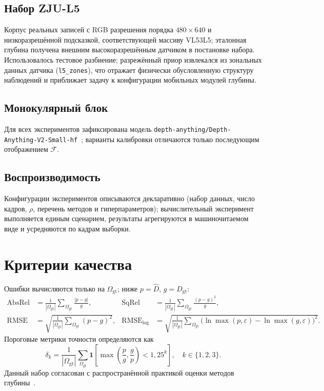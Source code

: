 \documentclass[12pt]{article}
\begin{document}
\subsection{Набор ZJU-L5}

Корпус реальных записей с RGB разрешения порядка $480\times640$ и низкоразрешённой подсказкой, соответствующей массиву VL53L5; эталонная глубина получена внешним высокоразрешённым датчиком в постановке набора. Использовалось тестовое разбиение; разрежённый приор извлекался из зональных данных датчика (\texttt{l5\_zones}), что отражает физически обусловленную структуру наблюдений и приближает задачу к конфигурации мобильных модулей глубины.

\subsection{Монокулярный блок}

Для всех экспериментов зафиксирована модель \texttt{depth-anything/Depth-Anything-V2-Small-hf}~\cite{yang2024depthanythingv2}; варианты калибровки отличаются только последующим отображением $\mathcal{F}$.

\subsection{Воспроизводимость}

Конфигурации экспериментов описываются декларативно (набор данных, число кадров, $\rho$, перечень методов и гиперпараметров); вычислительный эксперимент выполняется единым сценарием, результаты агрегируются в машиночитаемом виде и усредняются по кадрам выборки.

\section{Критерии качества}
\label{sec:metrics}

Ошибки вычисляются только на $\Omega_{\mathrm{gt}}$; ниже $p=\hat D$, $g=D_{\mathrm{gt}}$:
\begin{align*}
  \mathrm{AbsRel} &= \frac{1}{|\Omega_{\mathrm{gt}}|}\sum_{\Omega_{\mathrm{gt}}}\frac{|p-g|}{g}, &
  \mathrm{SqRel} &= \frac{1}{|\Omega_{\mathrm{gt}}|}\sum_{\Omega_{\mathrm{gt}}}\frac{(p-g)^2}{g},\\
  \mathrm{RMSE} &= \sqrt{\frac{1}{|\Omega_{\mathrm{gt}}|}\sum_{\Omega_{\mathrm{gt}}}(p-g)^2}, &
  \mathrm{RMSE}_{\log} &= \sqrt{\frac{1}{|\Omega_{\mathrm{gt}}|}\sum_{\Omega_{\mathrm{gt}}}\bigl(\ln\max(p,\varepsilon)-\ln\max(g,\varepsilon)\bigr)^2}.
\end{align*}
Пороговые метрики точности определяются как
\[
  \delta_k = \frac{1}{|\Omega_{\mathrm{gt}}|}\sum_{\Omega_{\mathrm{gt}}}\mathbf{1}\!\left[\max\!\left(\frac{p}{g},\frac{g}{p}\right)<1{,}25^k\right],\quad k\in\{1,2,3\}.
\]
Данный набор согласован с распространённой практикой оценки методов глубины~\cite{eigen2014depth}.
\end{document}
